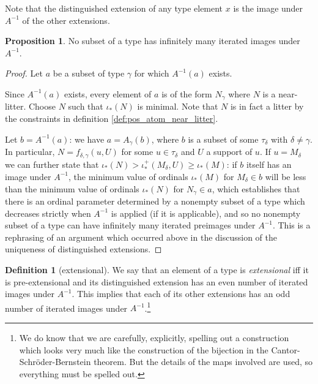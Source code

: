 \documentclass[112pt]{article}
\theoremstyle{definition}
\newtheorem{proposition}[theorem]{Proposition}
\newtheorem{definition}[theorem]{Definition}
\theoremstyle{remark}
\begin{document}
Note that the distinguished extension of any type element $x$ is the image under $A^{-1}$ of the other extensions.

\begin{proposition}\label{prop:a_map_well_founded}
No subset of a type has infinitely many iterated images under $A^{-1}$.
\end{proposition}
\begin{proof}
Let $a$ be a subset of type $\gamma$ for which $A^{-1}(a)$ exists.

Since $A^{-1}(a)$ exists, every element of $a$ is of the form $N_\gamma$ where $N$ is a near-litter.  Choose $N$ such that $\iota_*(N)$ is minimal.  Note that $N$ is in fact a litter {by the constraints in definition \ref{def:pos_atom_near_litter}}.

Let $b = A^{-1}(a)$:  we have $a = A_\gamma(b)$, where $b$ is a subset of some $\tau_\delta$ with $\delta \neq \gamma$.  In particular, $N = f_{\delta,\gamma}(u,U)$ for
some $u \in \tau_\delta$ and $U$ a support of $u$.  If $u=M_\delta$ we can further state that $\iota_*(N) > \iota^+_*(M_\delta,U) \geq \iota_*(M)$:  if $b$ itself has an image under $A^{-1}$, the minimum value of ordinals $\iota_*(M)$ for $M_\delta \in b$ will be less than the minimum value of ordinals $\iota_*(N)$ for $N_\gamma\in a$, which establishes that there is an ordinal parameter determined by a nonempty subset of a type which decreases strictly when $A^{-1}$ is applied (if it is applicable), and so no nonempty subset of a type
can have infinitely many iterated preimages under $A^{-1}$.  This is a rephrasing of an argument which occurred above in the discussion of the uniqueness of distinguished extensions.
\end{proof}

\begin{definition}[extensional]\label{def:extensional}
We say that an element of a type is {\em extensional\/} iff
it is pre-extensional and its distinguished extension has an even number of iterated images under $A^{-1}$.
This implies that each of its other extensions has an odd number of iterated images under $A^{-1}$.\footnote{We do know that we are carefully, explicitly, spelling out a construction which looks very much
like the construction of the bijection in the Cantor-Schr\"oder-Bernstein theorem.  But the details of the maps involved are used, so everything must be spelled out.}
\end{definition}
\end{document}
